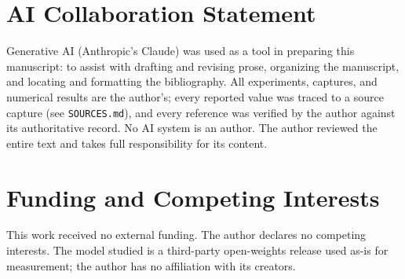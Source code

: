 \documentclass[10pt,twocolumn]{article}
\begin{document}
\section*{AI Collaboration Statement}

Generative AI (Anthropic's Claude) was used as a tool in preparing this
manuscript: to assist with drafting and revising prose, organizing the
manuscript, and locating and formatting the bibliography. All experiments,
captures, and numerical results are the author's; every reported value was
traced to a source capture (see \texttt{SOURCES.md}), and every reference was
verified by the author against its authoritative record. No AI system is an
author. The author reviewed the entire text and takes full responsibility for
its content.

\section*{Funding and Competing Interests}

This work received no external funding. The author declares no competing
interests. The model studied is a third-party open-weights release used as-is
for measurement; the author has no affiliation with its creators.



\end{document}
